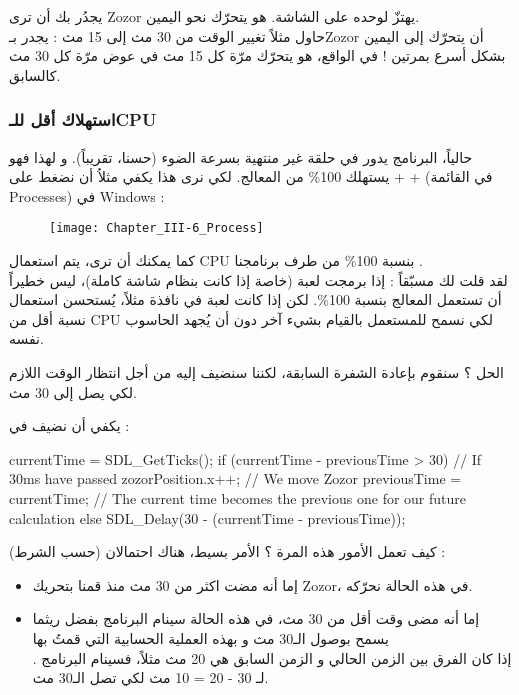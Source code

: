 يجدُر بك أن ترى
\textenglish{Zozor}
يهتزّ لوحده على الشاشة. هو يتحرّك نحو اليمين. \\
حاول مثلاً تغيير الوقت من 30 مث إلى 15 مث : يجدر بـ\textenglish{Zozor}
أن يتحرّك إلى اليمين بشكل أسرع بمرتين ! في الواقع، هو يتحرّك مرّة كل 15 مث في عوض مرّة كل 30 مث كالسابق.

\subsubsection{استهلاك أقل للـ\textenglish{CPU}}

حالياً، البرنامج يدور في حلقة غير منتهية بسرعة الضوء (حسنا، تقريباً). و لهذا فهو يستهلك 100\% من المعالج. لكي نرى هذا يكفي مثلاُ أن نضغط على 
 +  + 
(في القائمة
\textenglish{Processes})
في
\textenglish{Windows} :

\begin{figure}[H]
	\centering
	\texttt{[image: Chapter\_III-6\_Process]}
\end{figure}

كما يمكنك أن ترى، يتم استعمال
\textenglish{CPU}
بنسبة 100\% من طرف برنامجنا
.\\
لقد قلت لك مسبّقاً : إذا برمجت لعبة (خاصة إذا كانت بنظام شاشة كاملة)، ليس خطيراً أن تستعمل المعالج بنسبة 100\%. لكن إذا كانت لعبة في نافذة مثلاً، يُستحسن استعمال نسبة أقل من
\textenglish{CPU}
لكي نسمح للمستعمل بالقيام بشيء آخر دون أن يُجهد الحاسوب نفسه.

الحل ؟ سنقوم بإعادة الشفرة السابقة، لكننا سنضيف إليه
من أجل انتظار الوقت اللازم لكي يصل إلى 30 مث.

يكفي أن نضيف
في 
 :

\begin{Csource}
currentTime = SDL_GetTicks();
if (currentTime - previousTime > 30) // If 30ms have passed
{
	zozorPosition.x++; // We move Zozor
	previousTime = currentTime; // The current time becomes the previous one for our future calculation
}
else
{
	SDL_Delay(30 - (currentTime - previousTime));
}
\end{Csource}

كيف تعمل الأمور هذه المرة ؟ الأمر بسيط، هناك احتمالان (حسب الشرط) :

\begin{itemize}
	\item إما أنه مضت اكثر من 30 مث منذ قمنا بتحريك
	\textenglish{Zozor}،
	في هذه الحالة نحرّكه.
	\item إما أنه مضى وقت أقل من 30 مث، في هذه الحالة سينام البرنامج بفضل
	ريثما يسمح بوصول الـ30 مث و بهذه العملية الحسابية التي قمتُ بها\\
	.
	إذا كان الفرق بين الزمن الحالي و الزمن السابق هي 20 مث مثلاً، فسينام البرنامج لـ
	30 - 20 = 10
	مث لكي تصل الـ30 مث.
\end{itemize}

